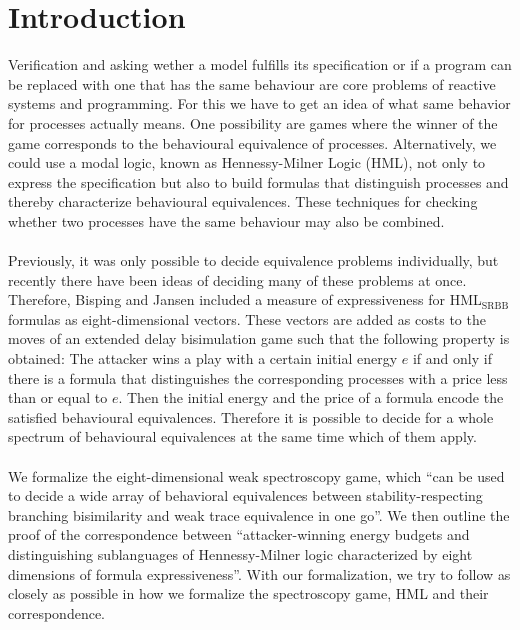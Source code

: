 \newpage
\section{Introduction} %
Verification and asking wether a model fulfills its specification or if a program can be replaced with one that has the same behaviour are core problems of reactive systems and programming.
For this we have to get an idea of what same behavior for processes actually means.
One possibility are games where the winner of the game corresponds to the behavioural equivalence of processes.
Alternatively, we could use a modal logic, known as Hennessy-Milner Logic (HML), not only to express the specification but also to build formulas that distinguish processes and 
thereby characterize behavioural equivalences.
These techniques for checking whether two processes have the same behaviour may also be combined.
\\\\
Previously, it was only possible to decide equivalence problems individually, but recently there have been ideas of deciding many of these problems at once.
Therefore, Bisping and Jansen \cite{bisping2023lineartimebranchingtime} included a measure of expressiveness for HML$_\text{{SRBB}}$ formulas as eight-dimensional vectors.
These vectors are added as costs to the moves of an extended delay bisimulation game such that the following property is obtained: 
The attacker wins a play with a certain initial energy $e$ if and only if there is a formula that distinguishes the corresponding processes with a price less than or equal to $e$.
Then the initial energy and the price of a formula encode the satisfied behavioural equivalences.
Therefore it is possible to decide for a whole spectrum of behavioural equivalences at the same time which of them apply.
\\\\
We formalize the eight-dimensional weak spectroscopy game, 
which ``can be used to decide a wide array of behavioral equivalences between stability-respecting branching bisimilarity and weak trace equivalence in one go''\cite{bisping2023lineartimebranchingtime}.
We then outline the proof of the correspondence between ``attacker-winning energy budgets and distinguishing sublanguages of Hennessy-Milner logic characterized by eight dimensions of formula expressiveness''.
With our formalization, we try to follow \cite{bisping2023lineartimebranchingtime} as closely as possible in how we formalize the spectroscopy game, HML and their correspondence.

